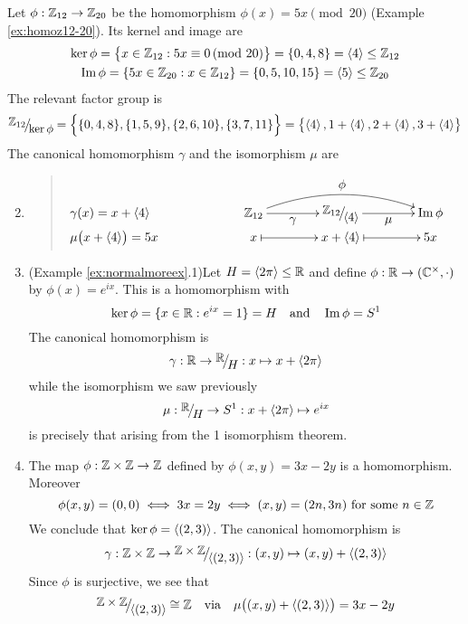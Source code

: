 \begin{examples}{}{}
	\exstart Let $\phi:\mathbb{Z}_{12}\to\mathbb{Z}_{20}$ be the homomorphism $\phi(x)=5x\!\!\pmod{20}$ (Example \ref{ex:homoz12-20}). Its kernel and image are
	\begin{gather*}
		\ker\phi
		=\bigl\{x\in\mathbb{Z}_{12}:5x\equiv 0\negthickspace\pmod{20}\bigr\}
		=\{0,4,8\}
		=\left\langle 4\right\rangle\le \mathbb{Z}_{12}\\
		\operatorname{Im}\phi=\{5x\in\mathbb{Z}_{20}:x\in\mathbb{Z}_{12}\}
		=\{0,5,10,15\}
		=\left\langle 5\right\rangle\le\mathbb{Z}_{20}
	\end{gather*}
	The relevant factor group is
	\[
		\quotient{\Z_{12}}{\ker\phi}
		=\Bigl\{\{0,4,8\},\{1,5,9\},\{2,6,10\},\{3,7,11\}\Bigr\}  
		=\bigl\{\ip 4,1+\ip 4,2+\ip 4,3+\ip 4\bigr\}
	\]
	The canonical homomorphism $\gamma$ and the isomorphism $\mu$ are\vspace{-5pt}
	\begin{enumerate}\setcounter{enumi}{1}
	  \item[]\begin{quote}
			$\SelectTips{cm}{}\xymatrix @C40pt @R0pt{%
				\rlap{$\gamma(x)=x+\ip 4$} &&& \Z_{12} \ar@{->}[r]_-{\textstyle\gamma} \ar@{->}@/^15pt/[rr]^{\textstyle\phi} & \quotient{\Z_{12}}{\ip 4} \ar@{->}[r]_-{\textstyle\mu} & \image\phi\\
				\rlap{$\mu\bigl(x+\ip 4\bigr)=5x$} &&& x \ar@{|->}[r] & x+\ip 4 \ar@{|->}[r] & 5x
			}$
		\end{quote}
	  
	\item (Example \ref{ex:normalmoreex}.1)\lstsp Let $H=\left\langle 2\pi\right\rangle\le\mathbb{R}$ and define $\phi:\mathbb{R}\to(\mathbb{C}^\times,\cdot)$ by $\phi(x)=e^{ix}$. This is a homomorphism with
  \[
  	\ker\phi=\{x\in\mathbb{R}:e^{ix}=1\}=H
  	\quad\text{and}\quad 
  	\operatorname{Im}\phi=S^1
  \]
  The canonical homomorphism is
  \[
  	\gamma:\R\to\quotient{\R}H:x\mapsto x+\ip{2\pi}
  \]
  while the isomorphism we saw previously
  \[
  	\mu:\quotient\R H\to S^1:x+\ip{2\pi}\mapsto e^{ix}
  \]
  is precisely that arising from the 1\st{} isomorphism theorem.
  
  \item The map $\phi:\mathbb{Z}\times\mathbb{Z}\to\mathbb{Z}$ defined by $\phi(x,y)=3x-2y$ is a homomorphism. Moreover
  \[
  	\phi(x,y)=(0,0)\iff 3x=2y\iff (x,y)=(2n,3n)\text{ for some $n\in\mathbb{Z}$}
  \]
  We conclude that $\ker\phi=\left\langle (2,3)\right\rangle$. The canonical homomorphism is
  \[
  	\gamma:\Z\times\Z\to
  	\quotient{\Z\times\Z}{\ip{(2,3)}}:
  	(x,y)\mapsto (x,y)+\ip{(2,3)}
  \]
  Since $\phi$ is surjective, we see that
  \[
  	\quotient{\Z\times\Z}{\ip{(2,3)}}\cong\Z
  	\quad\text{via}\quad 
  	\mu\bigl((x,y)+\ip{(2,3)}\bigr)=3x-2y
  \]
	\end{enumerate}
\end{examples}


